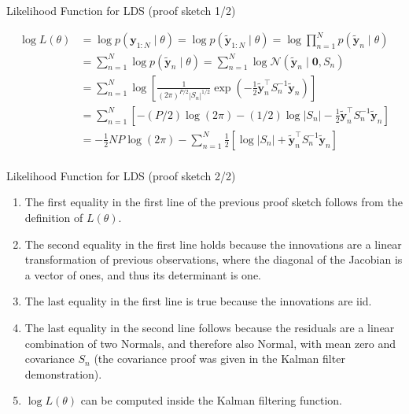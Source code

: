 \begin{frame}{Likelihood Function for LDS (proof sketch 1/2)}
    \setlength{\jot}{1pt} %

	\begin{align*}
		\log L(\theta) &=\log p(\mathbf{y}_{1:N} \mid \theta)=\log p(\tilde{\mathbf{y}}_{1:N} \mid \theta)=\log \prod_{n=1}^Np(\tilde{\mathbf{y}}_n \mid \theta)\\
                       &=\sum_{n=1}^N\log p(\tilde{\mathbf{y}}_n \mid \theta)=\sum_{n=1}^N\log\mathcal{N}(\tilde{\mathbf{y}}_n \mid \mathbf{0},S_n)\\
                       &=\sum_{n=1}^N\log\left[\frac{1}{(2\pi)^{P/2}|S_n|^{1/2}}\exp\left(-\frac{1}{2}\tilde{\mathbf{y}}_n^\intercal S_n^{-1}\tilde{\mathbf{y}}_n\right)\right]\\
                       &=\sum_{n=1}^N\left[-(P/2)\log(2\pi)-(1/2)\log|S_n|-\frac{1}{2}\tilde{\mathbf{y}}_n^\intercal S_n^{-1}\tilde{\mathbf{y}}_n\right]\\
                       &=-\frac{1}{2}NP\log(2\pi)-\sum_{n=1}^N\frac{1}{2}
                       \left[\log|S_n|+\tilde{\mathbf{y}}_n^\intercal S_n^{-1}\tilde{\mathbf{y}}_n\right]\\
	\end{align*}

\end{frame}

\begin{frame}{Likelihood Function for LDS (proof sketch 2/2)}

    \small
    \begin{enumerate}

        \item The first equality in the first line of the previous proof sketch
            follows from the definition of $L(\theta)$.

        \item The second equality in the first line holds because the
            innovations
            are a linear transformation of previous observations, where the
            diagonal of the Jacobian is a vector of ones, and thus its
            determinant is one.

        \item The last equality in the first line is true because the
            innovations are iid.

        \item The last equality in the second line follows because the
            residuals are a linear combination of two Normals, and therefore
            also Normal, with mean zero and covariance $S_n$ (the covariance
            proof was given in the Kalman filter demonstration).

        \item $\log L(\theta)$ can be computed inside the Kalman filtering function.

    \end{enumerate}

\end{frame}

